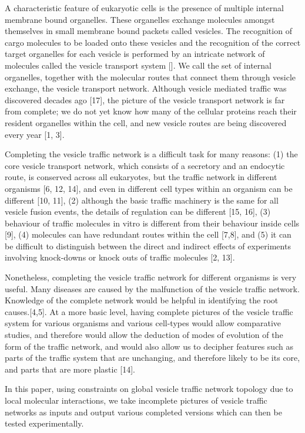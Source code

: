 A characteristic feature of eukaryotic cells is the presence of multiple internal membrane bound organelles. 
%
These organelles exchange molecules amongst themselves in small membrane bound packets called vesicles. 
%
The recognition of cargo molecules to be loaded onto these vesicles and the recognition of the correct target organelles for each vesicle is performed by an intricate network of molecules called the vesicle transport system []. 
%
We call the set of internal organelles, together with the molecular routes that connect them through vesicle exchange, the vesicle transport network. 
%
Although vesicle mediated traffic was discovered decades ago [17], the picture of the vesicle transport network is far from complete; we do not yet know how many of the cellular proteins reach their resident organelles within the cell, and new vesicle routes are being discovered every year [1, 3]. 

Completing the vesicle traffic network is a difficult task for many reasons: (1) the core vesicle transport network, which consists of a secretory and an endocytic route, is conserved across all eukaryotes, but the traffic network in different organisms [6, 12, 14], and even in different cell types within an organism can be different [10, 11], (2) although the basic traffic machinery is the same for all vesicle fusion events, the details of regulation can be different [15, 16], (3) behaviour of traffic molecules in vitro is different from their behaviour inside cells [9], (4) molecules can have redundant routes within the cell [7,8], and (5) it can be difficult to distinguish between the direct and indirect effects of experiments involving knock-downs or knock outs of traffic molecules [2, 13].

Nonetheless, completing the vesicle traffic network for different organisms is very useful. Many diseases are caused by the malfunction of the vesicle traffic network. Knowledge of the complete network would be helpful in identifying the root causes.[4,5]. At a more basic level, having complete pictures of the vesicle traffic system for various organisms and various cell-types would allow comparative studies, and therefore would allow the deduction of modes of evolution of the form of the traffic network, and would also allow us to decipher features such as parts of the traffic system that are unchanging, and therefore likely to be its core, and parts that are more plastic [14].

In this paper, using constraints on global vesicle traffic network topology due to local molecular interactions, we take incomplete pictures of vesicle traffic networks as inputs and output various completed versions which can then be tested experimentally.


